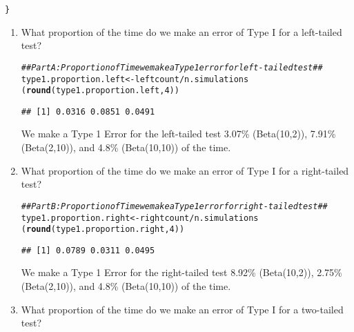 \documentclass{article}\usepackage[]{graphicx}\usepackage[]{xcolor}
\makeatletter
\newcommand{\hlnum}[1]{\textcolor[rgb]{0.686,0.059,0.569}{#1}}%
\newcommand{\hlcom}[1]{\textcolor[rgb]{0.678,0.584,0.686}{\textit{#1}}}%
\newcommand{\hlopt}[1]{\textcolor[rgb]{0,0,0}{#1}}%
\newcommand{\hldef}[1]{\textcolor[rgb]{0.345,0.345,0.345}{#1}}%
\newcommand{\hlkwb}[1]{\textcolor[rgb]{0.69,0.353,0.396}{#1}}%
\newcommand{\hlkwd}[1]{\textcolor[rgb]{0.737,0.353,0.396}{\textbf{#1}}}%
\newenvironment{kframe}{%
 \def\at@end@of@kframe{}%
 \ifinner\ifhmode%
  \def\at@end@of@kframe{\end{minipage}}%
  \begin{minipage}{\columnwidth}%
 \fi\fi%
 \def\FrameCommand##1{\hskip\@totalleftmargin \hskip-\fboxsep
 \colorbox{shadecolor}{##1}\hskip-\fboxsep
     \hskip-\linewidth \hskip-\@totalleftmargin \hskip\columnwidth}%
 \MakeFramed {\advance\hsize-\width
   \@totalleftmargin\z@ \linewidth\hsize
   \@setminipage}}%
 {\par\unskip\endMakeFramed%
 \at@end@of@kframe}
\newenvironment{knitrout}{}{} %
\makeatother
\begin{document}
\begin{enumerate}
\begin{knitrout}
\begin{kframe}
\begin{alltt}
\hldef{\}}
\end{alltt}
\end{kframe}
\end{knitrout}
  \begin{enumerate}
    \item What proportion of the time do we make an error of Type I for a
    left-tailed test?
\begin{knitrout}
\color{fgcolor}\begin{kframe}
\begin{alltt}
\hlcom{## Part A: Proportion of Time we make a Type 1 error for left-tailed test ##}
\hldef{type1.proportion.left} \hlkwb{<-} \hldef{leftcount}\hlopt{/}\hldef{n.simulations}
\hldef{(}\hlkwd{round}\hldef{(type1.proportion.left,} \hlnum{4}\hldef{))}
\end{alltt}
\begin{verbatim}
## [1] 0.0316 0.0851 0.0491
\end{verbatim}
\end{kframe}
\end{knitrout}
We make a Type 1 Error for the left-tailed test 3.07\% (Beta(10,2)), 7.91\% (Beta(2,10)), and 4.8\% (Beta(10,10)) of the time.
    \item What proportion of the time do we make an error of Type I for a
    right-tailed test?
\begin{knitrout}
\color{fgcolor}\begin{kframe}
\begin{alltt}
\hlcom{## Part B: Proportion of Time we make a Type 1 error for right-tailed test ##}
\hldef{type1.proportion.right} \hlkwb{<-} \hldef{rightcount}\hlopt{/}\hldef{n.simulations}
\hldef{(}\hlkwd{round}\hldef{(type1.proportion.right,} \hlnum{4}\hldef{))}
\end{alltt}
\begin{verbatim}
## [1] 0.0789 0.0311 0.0495
\end{verbatim}
\end{kframe}
\end{knitrout}
We make a Type 1 Error for the right-tailed test 8.92\% (Beta(10,2)), 2.75\% (Beta(2,10)), and 4.8\% (Beta(10,10)) of the time.
    \item What proportion of the time do we make an error of Type I for a
    two-tailed test?
\begin{knitrout}
\color{fgcolor}\begin{kframe}

\end{kframe}
\end{knitrout}
\end{enumerate}
\end{enumerate}
\end{document}
